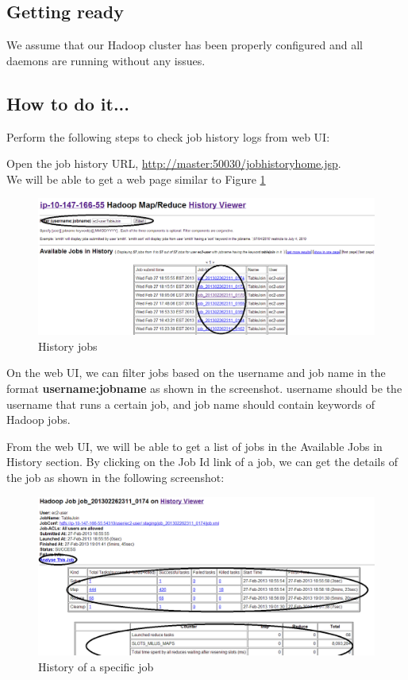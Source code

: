 \subsection*{Getting ready}
We assume that our Hadoop cluster has been properly configured and all daemons are running without any issues.
\subsection*{How to do it...}
Perform the following steps to check job history logs from web UI:

Open the job history URL, \url{http://master:50030/jobhistoryhome.jsp}. \\
We will be able to get a web page similar to Figure \ref{fig:history.jobs}
\begin{figure}[h]
  \centering
  \includegraphics[width=\textwidth]{figs/5163os_04_01.png}
  \caption{History jobs}\label{fig:history.jobs}
\end{figure} 

On the web UI, we can filter jobs based on the username and job name in the format \textbf{username:jobname} as shown in the screenshot. username should be the username that runs a certain job, and job name should contain keywords of Hadoop jobs.

From the web UI, we will be able to get a list of jobs in the Available Jobs in History section. By clicking on the Job Id link of a job, we can get the details of the job as shown in the following screenshot:
\begin{figure}[h]
  \centering
  \includegraphics[width=\textwidth]{figs/5163os_04_02.png}
  \caption{History of a specific job}\label{fig:specific.job.history}
\end{figure} 

